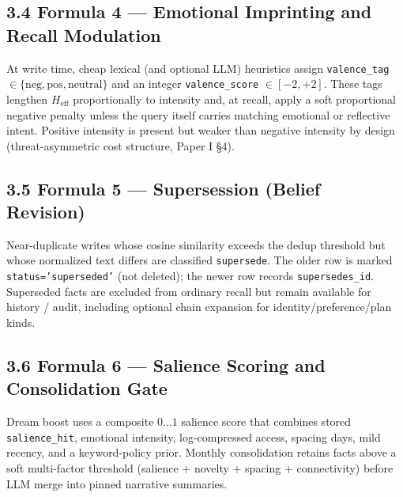 \documentclass[]{article}
\begin{document}
\hypertarget{formula-4-emotional-imprinting-and-recall-modulation}{%
\subsection{\texorpdfstring{\textbf{3.4 Formula 4 --- Emotional Imprinting
and Recall
Modulation}}{3.4 Formula 4 --- Emotional Imprinting and Recall Modulation}}\label{formula-4-emotional-imprinting-and-recall-modulation}}

At write time, cheap lexical (and optional LLM) heuristics assign
\texttt{valence\_tag} \(\in\{\text{neg},\text{pos},\text{neutral}\}\) and
an integer \texttt{valence\_score} \(\in[-2,+2]\). These tags lengthen
\(H_{\text{eff}}\) proportionally to intensity and, at recall, apply a
soft proportional negative penalty unless the query itself carries
matching emotional or reflective intent. Positive intensity is present
but weaker than negative intensity by design (threat-asymmetric cost
structure, Paper I §4).

\hypertarget{formula-5-supersession}{%
\subsection{\texorpdfstring{\textbf{3.5 Formula 5 --- Supersession
(Belief
Revision)}}{3.5 Formula 5 --- Supersession (Belief Revision)}}\label{formula-5-supersession}}

Near-duplicate writes whose cosine similarity exceeds the dedup threshold
but whose normalized text differs are classified \texttt{supersede}. The
older row is marked \texttt{status='superseded'} (not deleted); the newer
row records \texttt{supersedes\_id}. Superseded facts are excluded from
ordinary recall but remain available for history / audit, including
optional chain expansion for identity/preference/plan kinds.

\hypertarget{formula-6-salience-and-consolidation}{%
\subsection{\texorpdfstring{\textbf{3.6 Formula 6 --- Salience Scoring and
Consolidation
Gate}}{3.6 Formula 6 --- Salience Scoring and Consolidation Gate}}\label{formula-6-salience-and-consolidation}}

Dream boost uses a composite \(0\ldots1\) salience score that combines
stored \texttt{salience\_hit}, emotional intensity, log-compressed access,
spacing days, mild recency, and a keyword-policy prior. Monthly
consolidation retains facts above a soft multi-factor threshold
(salience + novelty + spacing + connectivity) before LLM merge into pinned
narrative summaries.
\end{document}
